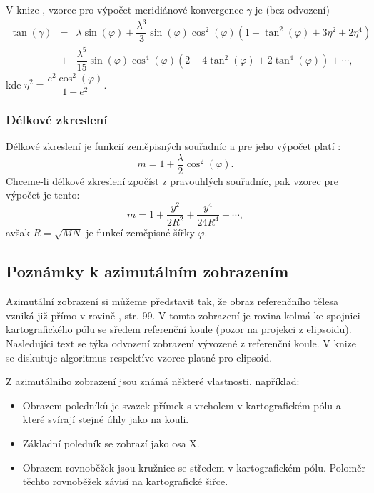 V knize \cite{Buchar2002}, vzorec pro výpočet meridiánové konvergence $\gamma$ je (bez odvození)
\begin{eqnarray}
\tan{\left(\gamma\right)} &=& \lambda\sin{\left(\varphi\right)} + \dfrac{\lambda^{3}}{3}\sin{\left(\varphi\right)} \cos^{2}{\left(\varphi\right)}\left(1+\tan^{2}{\left(\varphi\right)} + 3\eta^{2} + 2\eta^{4} \right)  \\ \nonumber
                         &+&\dfrac{\lambda^{5}}{15}\sin{\left(\varphi\right)} \cos^{4}{\left(\varphi\right)}\left(2+4\tan^{2}{\left(\varphi\right)} +2\tan^{4}{\left(\varphi\right)} \right) + \cdots, \nonumber
\end{eqnarray}
kde $\eta^{2} = \dfrac{e^{2}\cos^{2}{\left(\varphi\right)}}{1-e^{2}}$.

\subsubsection*{Délkové zkreslení}
Délkové zkreslení je funkcií zeměpisných souřadníc a pre jeho výpočet platí \cite{Buchar2002}:
\begin{equation}
m = 1+\dfrac{\lambda}{2}\cos^{2}{\left(\varphi\right)}.
\end{equation}
Chceme-li délkové zkreslení zpočíst z pravouhlých souřadníc, pak vzorec pre výpočet je tento:
\begin{equation}
m = 1+\dfrac{y^{2}}{2R^{2}} + \dfrac{y^{4}}{24R^{4}} + \cdots,
\end{equation}
avšak $R = \sqrt{MN}$ je funkcí zeměpisné šířky $\varphi$.



\subsection{Poznámky k azimutálním zobrazením}

Azimutální zobrazení si můžeme představit tak, že obraz referenčního tělesa vzniká již přímo v rovině \cite{Buchar2002}, str. 99. V tomto zobrazení je rovina kolmá ke spojnici kartografického pólu se sředem referenční koule (pozor na projekci z elipsoidu). Nasledujíci text se týka odvození zobrazení vývozené z referenční koule. V knize \cite{Snyder1987} se diskutuje algoritmus respektíve vzorce platné pro elipsoid.

Z azimutálniho zobrazení jsou známá některé vlastnosti, například:

\begin{itemize}
\item Obrazem poledníků je svazek přímek s vrcholem v kartografickém pólu a které svírají stejné úhly jako na kouli.
\item Základní poledník se zobrazí jako osa X.
\item Obrazem rovnoběžek jsou kružnice se středem v kartografickém pólu. Poloměr těchto rovnoběžek závisí na kartografické šiřce.
\end{itemize} 

